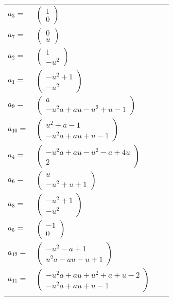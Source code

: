 \documentclass[1p]{elsarticle_modified}
\theoremstyle{definition}
\begin{document}
\begin{tabular}{m{7pt} m{180pt} m{7pt} m{180pt} }
\flushright $a_{3}=$&$\begin{pmatrix}1\\0\end{pmatrix}$ \\
\flushright $a_{7}=$&$\begin{pmatrix}0\\u\end{pmatrix}$ \\
\flushright $a_{2}=$&$\begin{pmatrix}1\\- u^2\end{pmatrix}$ \\
\flushright $a_{1}=$&$\begin{pmatrix}- u^2+1\\- u^2\end{pmatrix}$ \\
\flushright $a_{9}=$&$\begin{pmatrix}a\\- u^2 a+a u- u^2+u-1\end{pmatrix}$ \\
\flushright $a_{10}=$&$\begin{pmatrix}u^2+a-1\\- u^2 a+a u+u-1\end{pmatrix}$ \\
\flushright $a_{4}=$&$\begin{pmatrix}- u^2 a+a u- u^2- a+4 u\\2\end{pmatrix}$ \\
\flushright $a_{6}=$&$\begin{pmatrix}u\\- u^2+u+1\end{pmatrix}$ \\
\flushright $a_{8}=$&$\begin{pmatrix}- u^2+1\\- u^2\end{pmatrix}$ \\
\flushright $a_{5}=$&$\begin{pmatrix}-1\\0\end{pmatrix}$ \\
\flushright $a_{12}=$&$\begin{pmatrix}- u^2- a+1\\u^2 a- a u- u+1\end{pmatrix}$ \\
\flushright $a_{11}=$&$\begin{pmatrix}- u^2 a+a u+u^2+a+u-2\\- u^2 a+a u+u-1\end{pmatrix}$\\&\end{tabular}
\end{document}
